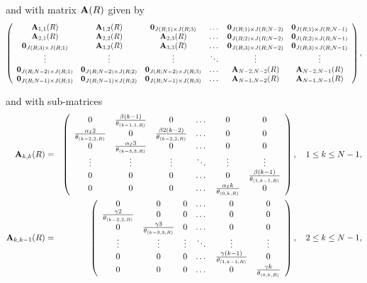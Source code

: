 \documentclass[10pt,A4paper]{article}
\begin{document}
\par\noindent and with matrix ${\bf A}(R)$ given by
\begin{equation*}
  \left(\begin{array}{cccccc}
{\bf A}_{1,1}(R) & {\bf A}_{1,2}(R) & {\bf 0}_{J(R;1)\times J(R;3)} & \dots & {\bf 0}_{J(R;1)\times J(R;N-2)} & {\bf 0}_{J(R;1)\times J(R;N-1)}\\
{\bf A}_{2,1}(R) & {\bf A}_{2,2}(R) & {\bf A}_{2,3}(R) & \dots & {\bf 0}_{J(R;2)\times J(R;N-2)} & {\bf 0}_{J(R;2)\times J(R;N-1)}\\
{\bf 0}_{J(R;3)\times J(R;1)} & {\bf A}_{3,2}(R) & {\bf A}_{3,3}(R) & \dots & {\bf 0}_{J(R;3)\times J(R;N-2)} & {\bf 0}_{J(R;3)\times J(R;N-1)}\\
\vdots & \vdots & \vdots & \ddots & \vdots & \vdots\\
{\bf 0}_{J(R;N-2)\times J(R;1)} & {\bf 0}_{J(R;N-2)\times J(R;2)} & {\bf 0}_{J(R;N-2)\times J(R;3)} & \dots & {\bf A}_{N-2,N-2}(R) & {\bf A}_{N-2,N-1}(R) \\
{\bf 0}_{J(R;N-1)\times J(R;1)} & {\bf 0}_{J(R;N-1)\times J(R;2)} & {\bf 0}_{J(R;N-1)\times J(R;3)} & \dots & {\bf A}_{N-1,N-2}(R) & {\bf A}_{N-1,N-1}(R)
                        \end{array}\right),
\end{equation*}
\par\noindent and with sub-matrices
\begin{eqnarray*}
 {\bf A}_{k,k}(R) &=& \left(\begin{array}{cccccc}
0 & \frac{\beta(k-1)}{\theta_{(k-1,1,R)}} & 0 & \dots & 0 & 0\\
\frac{\alpha_I2}{\theta_{(k-2,2,R)}} & 0 & \frac{\beta2(k-2)}{\theta_{(k-2,2,R)}} & \dots & 0 & 0\\
0 & \frac{\alpha_I3}{\theta_{(k-3,3,R)}} & 0 & \dots & 0 & 0\\
\vdots & \vdots & \vdots & \ddots & \vdots & \vdots\\
0 & 0 & 0 & \dots & 0 & \frac{\beta(k-1)}{\theta_{(1,k-1,R)}}\\
0 & 0 & 0 & \dots & \frac{\alpha_Ik}{\theta_{(0,k,R)}} & 0
                        \end{array}\right),\quad 1\leq k\leq N-1,\\
 {\bf A}_{k,k-1}(R) &=& \left(\begin{array}{cccccc}
0 & 0 & 0 & \dots & 0 & 0\\
\frac{\gamma2}{\theta_{(k-2,2,R)}} & 0 & 0 & \dots & 0 & 0\\
0 & \frac{\gamma3}{\theta_{(k-3,3,R)}} & 0 & \dots & 0 & 0\\
\vdots & \vdots & \vdots & \ddots & \vdots & \vdots\\
0 & 0 & 0 & \dots & \frac{\gamma(k-1)}{\theta_{(1,k-1,R)}} & 0\\
0 & 0 & 0 & \dots & 0 & \frac{\gamma k}{\theta_{(0,k,R)}}
                        \end{array}\right),\quad 2\leq k\leq N-1,
\end{eqnarray*}
\end{document}

